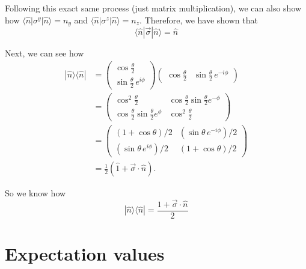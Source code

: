 \documentclass[12pt]{revtex4-2}
\begin{document}
Following this exact same process (just matrix multiplication), we can also show how $\langle \hat{n} | \sigma^y | \hat{n} \rangle = n_y$ and $\langle \hat{n} | \sigma^z | \hat{n} \rangle = n_z$.  Therefore, we have shown that
\begin{equation}
    \boxed{\langle \hat{n} | \vec{\sigma} | \hat{n} \rangle = \hat{n}}
\end{equation}

Next, we can see how 
\begin{align}
    | \hat{n} \rangle \langle \hat{n} | &= \begin{pmatrix}
        \cos\frac{\theta}{2} \\ \sin\frac{\theta}{2} \, e^{i\phi}
    \end{pmatrix}\begin{pmatrix}
        \cos\frac{\theta}{2} & \sin\frac{\theta}{2} \, e^{-i\phi}
    \end{pmatrix} \\
    &= \begin{pmatrix}
        \cos^2 \frac{\theta}{2} & \cos\frac{\theta}{2}\sin\frac{\theta}{2} e^{-\phi} \\ \cos\frac{\theta}{2}\sin\frac{\theta}{2} e^{\phi} & \cos^2 \frac{\theta}{2}
    \end{pmatrix} \\
    &= \begin{pmatrix}
        (1 + \cos\theta)/2 & (\sin\theta \, e^{-i\phi})/2 \\
        (\sin\theta \, e^{i\phi})/2 & (1 + \cos\theta)/2
    \end{pmatrix} \\
    &= \frac{1}{2} \left( \hat{1} + \vec{\sigma}\cdot\hat{n} \right).
\end{align}

So we know how 
\begin{equation}\label{eqn:rho_identity}
    \boxed{ |\hat{n}\rangle \langle \hat{n}| = \frac{1 + \vec{\sigma} \cdot \hat{n}}{2} }
\end{equation}

\newpage
\section{Expectation values}
\end{document}
